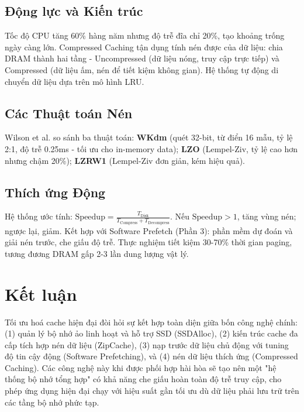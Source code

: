 \documentclass[10pt,twocolumn,a4paper]{article}
\begin{document}
\subsection{Động lực và Kiến trúc}
Tốc độ CPU tăng 60\% hàng năm nhưng độ trễ đĩa chỉ 20\%, tạo khoảng trống ngày càng lớn. Compressed Caching tận dụng tính nén được của dữ liệu: chia DRAM thành hai tầng - Uncompressed (dữ liệu nóng, truy cập trực tiếp) và Compressed (dữ liệu ấm, nén để tiết kiệm không gian). Hệ thống tự động di chuyển dữ liệu dựa trên mô hình LRU.

\subsection{Các Thuật toán Nén}
Wilson et al. \cite{wilson1999compressed} so sánh ba thuật toán: \textbf{WKdm} (quét 32-bit, từ điển 16 mẫu, tỷ lệ 2:1, độ trễ 0.25ms - tối ưu cho in-memory data); \textbf{LZO} (Lempel-Ziv, tỷ lệ cao hơn nhưng chậm 20\%); \textbf{LZRW1} (Lempel-Ziv đơn giản, kém hiệu quả).

\subsection{Thích ứng Động}
Hệ thống ước tính: $\text{Speedup} = \frac{T_{\text{Disk}}}{T_{\text{Compress}} + T_{\text{Decompress}}}$. Nếu $\text{Speedup} > 1$, tăng vùng nén; ngược lại, giảm. Kết hợp với Software Prefetch (Phần 3): phần mềm dự đoán và giải nén trước, che giấu độ trễ. Thực nghiệm tiết kiệm 30-70\% thời gian paging, tương đương DRAM gấp 2-3 lần dung lượng vật lý.

\section{Kết luận}

Tối ưu hoá cache hiện đại đòi hỏi sự kết hợp toàn diện giữa bốn công nghệ chính: (1) quản lý bộ nhớ ảo linh hoạt và hỗ trợ SSD (SSDAlloc), (2) kiến trúc cache đa cấp tích hợp nén dữ liệu (ZipCache), (3) nạp trước dữ liệu chủ động với tuning độ tin cậy động (Software Prefetching), và (4) nén dữ liệu thích ứng (Compressed Caching). Các công nghệ này khi được phối hợp hài hòa sẽ tạo nên một "hệ thống bộ nhớ tổng hợp" có khả năng che giấu hoàn toàn độ trễ truy cập, cho phép ứng dụng hiện đại chạy với hiệu suất gần tối ưu dù dữ liệu phải lưu trữ trên các tầng bộ nhớ phức tạp.



\end{document}
